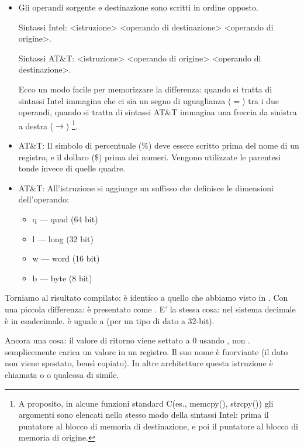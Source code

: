 \begin{itemize}

\item
Gli operandi sorgente e destinazione sono scritti in ordine opposto.

Sintassi Intel: <istruzione> <operando di destinazione> <operando di origine>.

Sintassi AT\&T: <istruzione> <operando di origine> <operando di destinazione>.

Ecco un modo facile per memorizzare la differenza:
quando si tratta di sintassi Intel immagina che ci sia un segno di uguaglianza ($=$) tra i due operandi, quando si tratta di sintassi AT\&T immagina una freccia da sinistra a destra ($\rightarrow$)
\footnote{A proposito, in alcune funzioni standard C(es., memcpy(), strcpy()) gli argomenti sono elencati nello stesso modo della sintassi Intel: prima il puntatore al blocco di memoria di destinazione, e poi il puntatore al blocco di memoria di origine.}.

\item
AT\&T: Il simbolo di percentuale (\%) deve essere scritto prima del nome di un registro, e il dollaro (\$) prima dei numeri.
Vengono utilizzate le parentesi tonde invece di quelle quadre.

\item
AT\&T: All'istruzione si aggiunge un suffisso che definisce le dimensioni dell'operando:

\begin{itemize}
\item q --- quad (64 bit)
\item l --- long (32 bit)
\item w --- word (16 bit)
\item b --- byte (8 bit)
\end{itemize}


\end{itemize}

Torniamo al risultato compilato: è identico a quello che abbiamo visto in \IDA.
Con una piccola differenza:  è presentato come .
E' la stessa cosa:  nel sistema decimale è  in esadecimale.
 è uguale a  (per un tipo di dato a 32-bit).

Ancora una cosa: il valore di ritorno viene settato a 0 usando \MOV, non \XOR.
\MOV semplicemente carica un valore in un registro.
Il suo nome è fuorviante (il dato non viene spostato, bensì copiato). In altre architetture questa istruzione è chiamata  o  o qualcosa di simile.
